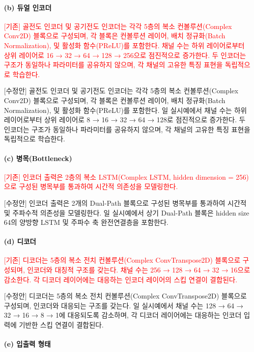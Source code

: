 \documentclass{article}
\newcommand{\reviewold}[1]{{\par\noindent\textcolor{red}{[기존] #1}}}
\newcommand{\reviewnew}[1]{{\par\noindent\textcolor{customblue}{[수정안] #1}}}
\newcommand{\reviewpair}[2]{\reviewold{#1}\reviewnew{#2}\par}
\begin{document}
\paragraph{(b) 듀얼 인코더}

\reviewpair{골전도 인코더 및 공기전도 인코더는 각각 5층의 복소 컨볼루션(Complex Conv2D) 블록으로 구성되며, 각 블록은 컨볼루션 레이어, 배치 정규화(Batch Normalization), 및 활성화 함수(PReLU)를 포함한다. 채널 수는 하위 레이어로부터 상위 레이어로 16 → 32 → 64 → 128 → 256으로 점진적으로 증가한다. 두 인코더는 구조가 동일하나 파라미터를 공유하지 않으며, 각 채널의 고유한 특징 표현을 독립적으로 학습한다.}{골전도 인코더 및 공기전도 인코더는 각각 5층의 복소 컨볼루션(Complex Conv2D) 블록으로 구성되며, 각 블록은 컨볼루션 레이어, 배치 정규화(Batch Normalization), 및 활성화 함수(PReLU)를 포함한다. 일 실시예에서 채널 수는 하위 레이어로부터 상위 레이어로 8 → 16 → 32 → 64 → 128로 점진적으로 증가한다. 두 인코더는 구조가 동일하나 파라미터를 공유하지 않으며, 각 채널의 고유한 특징 표현을 독립적으로 학습한다.}

\paragraph{(c) 병목(Bottleneck)}

\reviewpair{인코더 출력은 2층의 복소 LSTM(Complex LSTM, hidden dimension = 256)으로 구성된 병목부를 통과하여 시간적 의존성을 모델링한다.}{인코더 출력은 2개의 Dual-Path 블록으로 구성된 병목부를 통과하여 시간적 및 주파수적 의존성을 모델링한다. 일 실시예에서 상기 Dual-Path 블록은 hidden size 64의 양방향 LSTM 및 주파수 축 완전연결층을 포함한다.}

\paragraph{(d) 디코더}

\reviewpair{디코더는 5층의 복소 전치 컨볼루션(Complex ConvTranspose2D) 블록으로 구성되며, 인코더와 대칭적 구조를 갖는다. 채널 수는 256 → 128 → 64 → 32 → 16으로 감소한다. 각 디코더 레이어에는 대응하는 인코더 레이어의 스킵 연결이 결합된다.}{디코더는 5층의 복소 전치 컨볼루션(Complex ConvTranspose2D) 블록으로 구성되며, 인코더와 대응되는 구조를 갖는다. 일 실시예에서 채널 수는 128 → 64 → 32 → 16 → 8 → 1에 대응되도록 감소하며, 각 디코더 레이어에는 대응하는 인코더 입력에 기반한 스킵 연결이 결합된다.}

\paragraph{(e) 입출력 형태}
\end{document}
